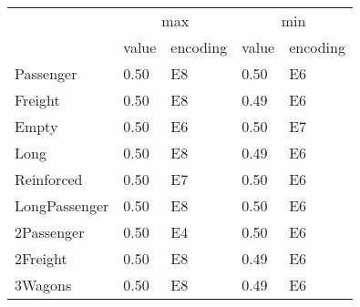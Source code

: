 \begin{tabular}{lllll}
\toprule
 & \multicolumn{2}{c}{max} & \multicolumn{2}{c}{min} \\
 & value & encoding & value & encoding \\
\midrule
Passenger & 0.50 & E8 & 0.50 & E6 \\
Freight & 0.50 & E8 & 0.49 & E6 \\
Empty & 0.50 & E6 & 0.50 & E7 \\
Long & 0.50 & E8 & 0.49 & E6 \\
Reinforced & 0.50 & E7 & 0.50 & E6 \\
LongPassenger & 0.50 & E8 & 0.50 & E6 \\
2Passenger & 0.50 & E4 & 0.50 & E6 \\
2Freight & 0.50 & E8 & 0.49 & E6 \\
3Wagons & 0.50 & E8 & 0.49 & E6 \\
\bottomrule
\end{tabular}
